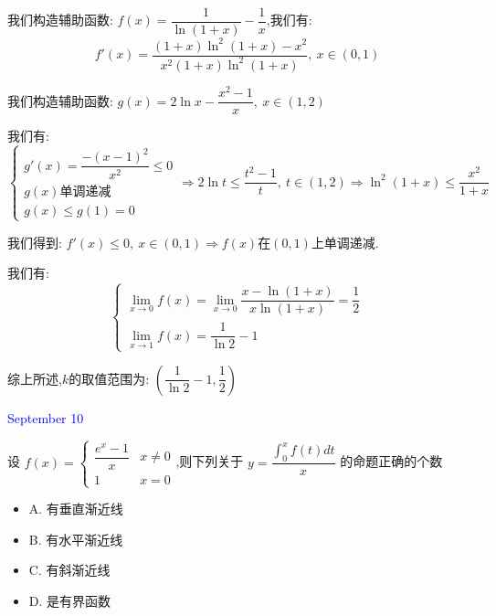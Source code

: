 \begin{solution}

	我们构造辅助函数:  $f(x)=\dfrac{1}{\ln(1+x)}-\dfrac{1}{x}$,我们有:  
	$$f'(x)=\dfrac{(1+x)\ln^2(1+x)-x^2}{x^2(1+x)\ln^2(1+x)},\ x\in(0,1)$$
	
	我们构造辅助函数:  $g(x)=2\ln x-\dfrac{x^2-1}{x},\ x\in(1,2)$
	
	我们有:  
	$$\left\lbrace
	\begin{array}{l}
		g'(x)=\dfrac{-(x-1)^2}{x^2}\leq 0\\
		g(x)\text{单调递减}\\
		g(x)\leq g(1)=0
	\end{array}
	\right. \Rightarrow 2\ln t\leq \dfrac{t^2-1}{t},\ t\in(1,2)\Rightarrow \ln^2(1+x)\leq \dfrac{x^2}{1+x}$$
	
	我们得到:  $f'(x)\leq 0,\ x\in(0,1)\Rightarrow f(x)$在$(0,1)$上单调递减.
	
	我们有:  $$\left\lbrace
	\begin{array}{l}
		\lim\limits_{x\to 0}f(x)=\lim\limits_{x\to 0}\dfrac{x-\ln(1+x)}{x\ln(1+x)}=\dfrac{1}{2}\\
		\lim\limits_{x\to 1}f(x)=\dfrac{1}{\ln 2}-1
	\end{array}
	\right. $$
	
	综上所述,$k$的取值范围为:  $(\dfrac{1}{\ln2}-1,\dfrac{1}{2})$
\end{solution}


\textcolor{blue}{September 10}

\begin{example}[][Exam: 35.2.5]
	设 $f(x)=
	\begin{cases}
		\dfrac{e^x-1}{x} & x\neq 0\\
		1 & x=0
	\end{cases}$,则下列关于 $y=\dfrac{\int_{0}^{x}f(t)dt}{x}$ 的命题正确的个数
\begin{itemize}
	\item A. 有垂直渐近线
	\item B. 有水平渐近线
	\item C. 有斜渐近线
	\item D. 是有界函数
\end{itemize}
\end{example}

